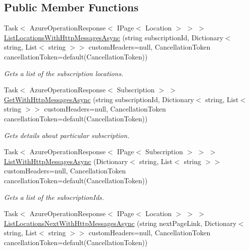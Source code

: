 \subsection*{Public Member Functions}
\begin{DoxyCompactItemize}
\item 
Task$<$ Azure\+Operation\+Response$<$ I\+Page$<$ Location $>$ $>$ $>$ \hyperlink{interface_microsoft_1_1_azure_1_1_management_1_1_resources_1_1_i_subscriptions_operations_ab64606da41b4c013a6d0120325aa245e}{List\+Locations\+With\+Http\+Messages\+Async} (string subscription\+Id, Dictionary$<$ string, List$<$ string $>$$>$ custom\+Headers=null, Cancellation\+Token cancellation\+Token=default(Cancellation\+Token))
\begin{DoxyCompactList}\small\item\em Gets a list of the subscription locations. \end{DoxyCompactList}\item 
Task$<$ Azure\+Operation\+Response$<$ Subscription $>$ $>$ \hyperlink{interface_microsoft_1_1_azure_1_1_management_1_1_resources_1_1_i_subscriptions_operations_a6b8613944f5cf5995f100bcfb7d4ba2a}{Get\+With\+Http\+Messages\+Async} (string subscription\+Id, Dictionary$<$ string, List$<$ string $>$$>$ custom\+Headers=null, Cancellation\+Token cancellation\+Token=default(Cancellation\+Token))
\begin{DoxyCompactList}\small\item\em Gets details about particular subscription. \end{DoxyCompactList}\item 
Task$<$ Azure\+Operation\+Response$<$ I\+Page$<$ Subscription $>$ $>$ $>$ \hyperlink{interface_microsoft_1_1_azure_1_1_management_1_1_resources_1_1_i_subscriptions_operations_a33722bd0f5485e9196e1242ad521c40b}{List\+With\+Http\+Messages\+Async} (Dictionary$<$ string, List$<$ string $>$$>$ custom\+Headers=null, Cancellation\+Token cancellation\+Token=default(Cancellation\+Token))
\begin{DoxyCompactList}\small\item\em Gets a list of the subscription\+Ids. \end{DoxyCompactList}\item 
Task$<$ Azure\+Operation\+Response$<$ I\+Page$<$ Location $>$ $>$ $>$ \hyperlink{interface_microsoft_1_1_azure_1_1_management_1_1_resources_1_1_i_subscriptions_operations_a972e2f414754d9996c40536420329e02}{List\+Locations\+Next\+With\+Http\+Messages\+Async} (string next\+Page\+Link, Dictionary$<$ string, List$<$ string $>$$>$ custom\+Headers=null, Cancellation\+Token cancellation\+Token=default(Cancellation\+Token))

\end{DoxyCompactItemize}
